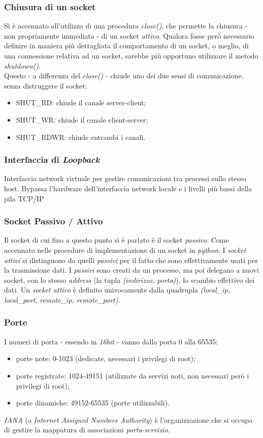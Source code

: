 \subsubsection{Chiusura di un socket}
Si è accennato all'utilizzo di una procedura \textit{close()}, che permette la chiusura - non propriamente immediata - di un socket \textit{attivo}. Qualora fosse però necessario definire in maniera più dettagliata il comportamento di un socket, o meglio, di una connessione relativa ad un socket, sarebbe più opportuno utilizzare il metodo \textit{shutdown()}. \\
Questo - a differenza del \textit{close()} - chiude uno dei due sensi di comunicazione, senza distruggere il socket:
    \begin{itemize}
        \item SHUT\_RD: chiude il canale server-client;
        \item SHUT\_WR: chiude il canale client-server;
        \item SHUT\_RDWR: chiude entrambi i canali.
    \end{itemize}

\subsubsection{Interfaccia di \textit{Loopback}}
Interfaccia network virtuale per gestire comunicazioni tra processi sullo stesso host. Bypassa l'hardware dell'interfaccia network locale e i livelli più bassi della pila TCP/IP

\subsubsection{Socket Passivo / Attivo}
Il socket di cui fino a questo punto si è parlato è il socket \textit{passivo}. Come accennato nelle procedure di implementazione di un socket in \textit{python}. I \textit{socket attivi} si distinguono da quelli \textit{passivi} per il fatto che sono effettivamente usati per la trasmissione dati. I \textit{passivi} sono creati da un processo, ma poi delegano a nuovi socket, con lo stesso \textit{address} (la tupla \textit{(indirizzo, porta)}), lo scambio effettivo dei dati. Un \textit{socket attivo} è definito univocamente dalla quadrupla \textit{(local\_ip, local\_port, remote\_ip, remote\_port)}.

\subsubsection{Porte}
I numeri di porta - essendo in \textit{16bit} - vanno dalla porta 0 alla 65535:
\begin{itemize}
    \item porte note: 0-1023 (dedicate, necessari i privilegi di root);
    \item porte registrate: 1024-49151 (utilizzate da servizi noti, non necessari però i privilegi di root);
    \item porte dinamiche: 49152-65535 (porte utilizzabili).
\end{itemize}
\textit{IANA} (o \textit{Internet Assigned Numbers Authority}) è l'organizzazione che si occupa di gestire la mappatura di associazioni \textit{porta-servizio}.

